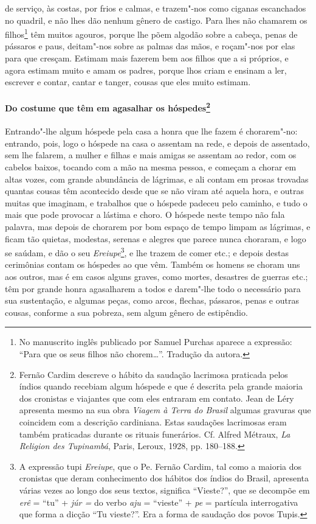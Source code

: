 de serviço, às costas, por frios e calmas, e trazem"-nos como ciganas
escanchados no quadril, e não lhes dão nenhum gênero de castigo. Para
lhes não chamarem os filhos\footnote{ No manuscrito inglês publicado
por Samuel Purchas aparece a expressão: ``Para que os seus filhos não
chorem\ldots''. Tradução da autora.} têm muitos agouros, porque lhe põem
algodão sobre a cabeça, penas de pássaros e paus, deitam"-nos sobre as
palmas das mãos, e roçam"-nos por elas para que cresçam. Estimam mais
fazerem bem aos filhos que a si próprios, e agora estimam muito e amam
os padres, porque lhos criam e ensinam a ler, escrever e contar, cantar
e tanger, cousas que eles muito estimam.

\paragraph[Do costume que têm em agasalhar os hóspedes]{Do costume que têm em 
agasalhar os hóspedes\protect\footnote{ Fernão Cardim descreve o hábito da
saudação lacrimosa praticada pelos índios quando recebiam algum
hóspede e que é descrita pela grande maioria dos cronistas e viajantes
que com eles entraram em contato. Jean de Léry apresenta mesmo na
sua obra \textit{Viagem à Terra do Brasil} algumas gravuras que
coincidem com a descrição cardiniana. Estas saudações lacrimosas eram
também praticadas durante os rituais funerários. Cf. Alfred Métraux,
\textit{La Religion des Tupinambá}, Paris, Leroux, 1928, pp. 180--188.}}

Entrando"-lhe algum hóspede pela casa a honra que lhe fazem é
chorarem"-no: entrando, pois, logo o hóspede na casa o assentam na rede,
e depois de assentado, sem lhe falarem, a mulher e filhas e mais
amigas se assentam ao redor, com os cabelos baixos, tocando com a mão
na mesma pessoa, e começam a chorar em altas vozes, com grande
abundância de lágrimas, e ali contam em prosas trovadas quantas cousas
têm acontecido desde que se não viram até aquela hora, e outras muitas
que imaginam, e trabalhos que o hóspede padeceu pelo caminho, e tudo o
mais que pode provocar a lástima e choro. O hóspede neste tempo não
fala palavra, mas depois de chorarem por bom espaço de tempo limpam as
lágrimas, e ficam tão quietas, modestas, serenas e alegres que parece
nunca choraram, e logo se saúdam, e dão o seu 
\textit{Ereiupe}\footnote{ A expressão tupi \textit{Ereiupe}, que o Pe. Fernão
Cardim, tal como a maioria dos cronistas que deram conhecimento dos
hábitos dos índios do Brasil, apresenta várias vezes ao longo dos seus
textos, significa ``Vieste?'', que se decompõe em \textit{erê} = ``tu'' +
\textit{júr =} do verbo \textit{aju} = ``vieste'' + \textit{pe} =
partícula interrogativa que forma a dicção ``Tu vieste?''. Era a forma
de saudação dos povos Tupis.}, e lhe trazem de comer etc.; e
depois destas cerimônias contam os hóspedes ao que vêm. Também os
homens se choram uns aos outros, mas é em casos alguns graves, como
mortes, desastres de guerras etc.; têm por grande honra agasalharem a
todos e darem"-lhe todo o necessário para sua sustentação, e algumas
peças, como arcos, flechas, pássaros, penas e outras cousas, conforme a
sua pobreza, sem algum gênero de estipêndio.

